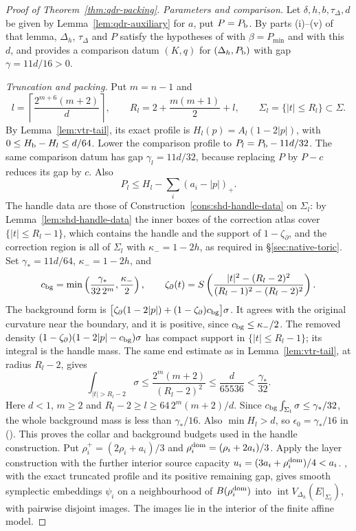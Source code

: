 \begin{proof}[Proof of Theorem~\ref{thm:qdr-packing}]
\emph{Parameters and comparison.} Let $\delta,h,b,\tau_\Delta,d$ be given by Lemma~\ref{lem:qdr-auxiliary} for $a$, put
$P=P_{\mathrm b}$. By parts (i)--(v) of that lemma, $\Delta_h$, $\tau_\Delta$ and $P$ satisfy the hypotheses of
 with $\beta=P_{\min}$ and with this $d$, and  provides a
comparison datum $(K,q)$ for $(\Delta_h,P_{\mathrm b})$ with gap $\gamma=11d/16>0$.

\emph{Truncation and packing.} Put $m=n-1$ and
\[
 l=\left\lceil\frac{2^{m+6}(m+2)}d\right\rceil,\qquad
 R_l=2+\frac{m(m+1)}2+l,\qquad \Sigma_l=\{|t|\le R_l\}\subset\Sigma.
\]
By Lemma~\ref{lem:vtr-tail}, its exact profile is $H_l(p)=A_l(1-2|p|)$, with
$0\le H_{\mathrm b}-H_l\le d/64$. Lower the comparison profile to
$P_l=P_{\mathrm b}-11d/32$. The same comparison datum has gap $\gamma_l=11d/32$, because replacing $P$ by $P-c$
reduces its gap by $c$. Also
\[
 P_l\le H_l-\sum_i(a_i-|p|)_+.
\]
The handle data are those of Construction~\ref{cons:shd-handle-data} on $\Sigma_l$: by Lemma~\ref{lem:shd-handle-data} the
inner boxes of the correction atlas cover $\{|t|\le R_l-1\}$, which contains the handle and the support of
$1-\zeta_\partial$, and the correction region is all of $\Sigma_l$ with $\kappa_-=1-2h$, as required in
\S\ref{sec:native-toric}. Set $\gamma_*=11d/64$, $\kappa_-=1-2h$, and
\[
 c_{\rm bg}=\min\left(\frac{\gamma_*}{32\,2^m},\frac{\kappa_-}{2}\right),\qquad
 \zeta_\partial(t)=S\left(\frac{|t|^2-(R_l-2)^2}{(R_l-1)^2-(R_l-2)^2}\right).
\]
The background form is $\big[\zeta_\partial(1-2|p|)+(1-\zeta_\partial)c_{\rm bg}\big]\sigma$.
It agrees with the original curvature near the boundary, and it is positive, since $c_{\rm bg}\le\kappa_-/2$. The removed density
$(1-\zeta_\partial)(1-2|p|-c_{\rm bg})\sigma$ has compact support in $\{|t|\le R_l-1\}$;
its integral is the handle mass. The same end estimate as in Lemma~\ref{lem:vtr-tail}, at radius $R_l-2$, gives
\[
 \int_{|t|>R_l-2}\sigma\le\frac{2^m(m+2)}{(R_l-2)^2}
 \le\frac{d}{65536}<\frac{\gamma_*}{32}.
\]
Here $d<1$, $m\ge2$ and $R_l-2\ge l\ge64\,2^m(m+2)/d$.
Since $c_{\rm bg}\int_{\Sigma_l}\sigma\le\gamma_*/32$, the whole background mass is less than
$\gamma_*/16$. Also $\min H_l>d$, so $\epsilon_0=\gamma_*/16$ in ().
This proves the collar and background budgets used in the handle construction.
Put $\rho_i^+=(2\rho_i+a_i)/3$ and $\rho_i^{\rm dom}=(\rho_i+2a_i)/3$.
Apply the layer construction with the further interior source capacity
$u_i=(3a_i+\rho_i^{\rm dom})/4<a_i$. , with the exact truncated profile
and its positive remaining gap, gives smooth symplectic embeddings $\psi_i$ on a neighbourhood of
$B(\rho_i^{\rm dom})$ into
$\operatorname{int}V_{\Delta_h}(E|_{\Sigma_l})$, with pairwise disjoint images. The images lie in the interior of the finite affine model.


\end{proof}
